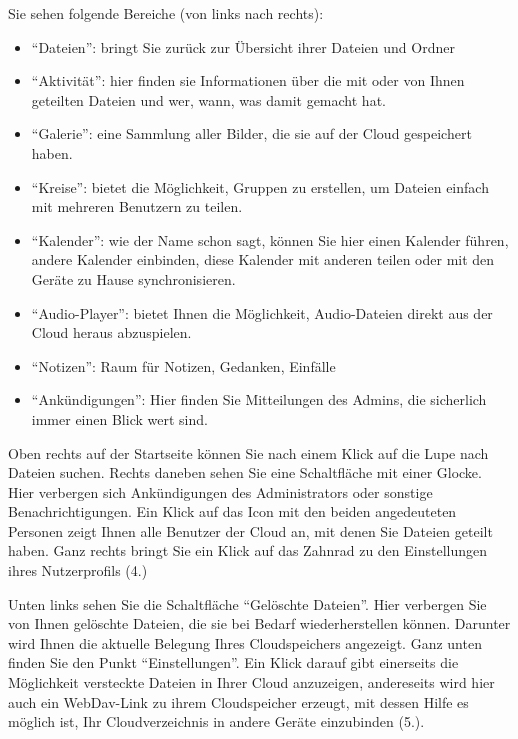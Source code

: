\documentclass[letterpaper,10pt,ngerman]{sphinxmanual}
\begin{document}
Sie sehen folgende Bereiche (von links nach rechts):
\begin{itemize}
\item {} 
``Dateien'': bringt Sie zurück zur Übersicht ihrer Dateien und Ordner

\item {} 
``Aktivität'': hier finden sie Informationen über die mit oder von Ihnen geteilten Dateien und wer, wann, was damit gemacht hat.

\item {} 
``Galerie'': eine Sammlung aller Bilder, die sie auf der Cloud gespeichert haben.

\item {} 
``Kreise'': bietet die Möglichkeit, Gruppen zu erstellen, um Dateien einfach mit mehreren Benutzern zu teilen.

\item {} 
``Kalender'': wie der Name schon sagt, können Sie hier einen Kalender führen, andere Kalender einbinden, diese Kalender mit anderen teilen oder mit den Geräte zu Hause synchronisieren.

\item {} 
``Audio-Player'': bietet Ihnen die Möglichkeit, Audio-Dateien direkt aus der Cloud heraus abzuspielen.

\item {} 
``Notizen'': Raum für Notizen, Gedanken, Einfälle

\item {} 
``Ankündigungen'': Hier finden Sie Mitteilungen des Admins, die sicherlich immer einen Blick wert sind.

\end{itemize}

Oben rechts auf der Startseite können Sie nach einem Klick auf die Lupe nach Dateien suchen.
Rechts daneben sehen Sie eine Schaltfläche mit einer Glocke. Hier verbergen sich Ankündigungen des Administrators oder sonstige Benachrichtigungen.
Ein Klick auf das Icon mit den beiden angedeuteten Personen zeigt Ihnen alle Benutzer der Cloud an, mit denen Sie Dateien geteilt haben.
Ganz rechts bringt Sie ein Klick auf das Zahnrad zu den Einstellungen ihres Nutzerprofils (4.)

Unten links sehen Sie die Schaltfläche ``Gelöschte Dateien''. Hier verbergen Sie von Ihnen gelöschte Dateien, die sie bei Bedarf wiederherstellen können.
Darunter wird Ihnen die aktuelle Belegung Ihres Cloudspeichers angezeigt.
Ganz unten finden Sie den Punkt ``Einstellungen''. Ein Klick darauf gibt einerseits die Möglichkeit versteckte Dateien in Ihrer Cloud anzuzeigen, andereseits wird hier auch ein
WebDav-Link zu ihrem Cloudspeicher erzeugt, mit dessen Hilfe es möglich ist, Ihr Cloudverzeichnis in andere Geräte einzubinden (5.).
\end{document}
